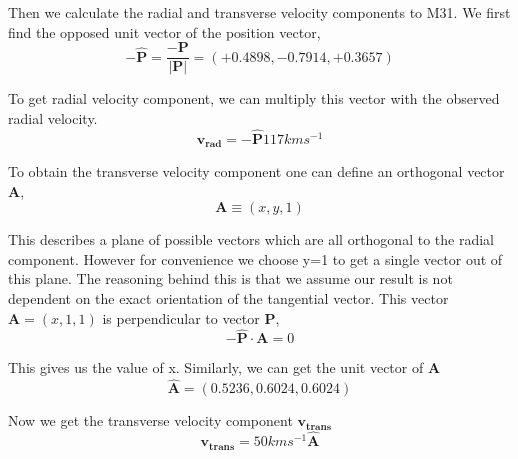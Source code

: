 \documentclass[a4paper,12pt, english]{article}
\begin{document}
\smallskip
Then we calculate the radial and transverse velocity components to M31. We first find the opposed unit vector of the position vector,
\begin{equation}
    \boldsymbol{-\hat{P}} = \frac{\boldsymbol{-P}}{|\boldsymbol{P}|} = \left(+0.4898,-0.7914,+0.3657\right)
\end{equation}\par
\smallskip
To get radial velocity component, we can multiply this vector with the observed radial velocity.
\begin{equation}
    \boldsymbol{v_{rad}} = \boldsymbol{-\hat{P}}117 km s^{-1}
\end{equation}\par
\smallskip
To obtain the transverse velocity component one can define an orthogonal vector $ \boldsymbol{A}$, 
\begin{equation}
    \boldsymbol{A} \equiv \left(x,y,1\right)
\end{equation}\par
\smallskip
This describes a plane of possible vectors which are all orthogonal to the radial component. However for convenience we choose y=1 to get a single vector out of this plane. The reasoning behind this is that we assume our result is not dependent on the exact orientation of the tangential vector. This vector $\boldsymbol{A} = \left(x,1,1\right)$ is perpendicular to vector $ \boldsymbol{P} $,
\begin{equation}
    \boldsymbol{-\hat{P}}\cdot\boldsymbol{A} = 0
\end{equation}\par
\smallskip
This gives us the value of x. Similarly, we can get the unit vector of $\boldsymbol{A}$ 
\begin{equation}
    \boldsymbol{\hat{A}} = \left(0.5236,0.6024,0.6024\right)
\end{equation}\par
\smallskip
Now we get the transverse velocity component $ \boldsymbol{v_{trans}} $
\begin{equation}
    \boldsymbol{v_{trans}} = 50 km s^{-1} \boldsymbol{\hat{A}}
\end{equation}\par
\smallskip
\end{document}
